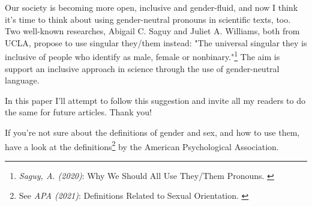 Our society is becoming more open, inclusive and gender-fluid, and now I think it's time to think about using gender-neutral pronouns in scientific texts, too. Two well-known researches, Abigail C. Saguy and Juliet A. Williams, both from UCLA, propose to use singular they/them instead: "The universal singular they is inclusive of people who identify as male, female or nonbinary."\footnote{\textit{Saguy, A. (2020)}: Why We Should All Use They/Them Pronouns. \cite{pronouns}} The aim is support an inclusive approach in science through the use of gender-neutral language. 

In this paper I'll attempt to follow this suggestion and invite all my readers to do the same for future articles. Thank you!

If you're not sure about the definitions of gender and sex, and how to use them, have a look at the definitions\footnote{See \textit{APA (2021)}: Definitions Related to Sexual Orientation. \cite{apaDefinitions}} by the American Psychological Association.

